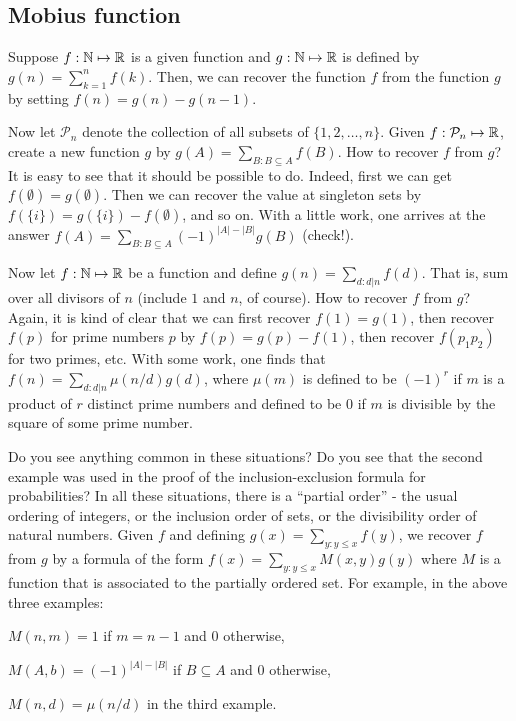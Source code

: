 \documentclass[preprint,  11pt]{amsart}
\begin{document}
{\color{Sepia}
\small
\subsection{Mobius function} Suppose $f:\mathbb{N}\mapsto \mathbb{R}$ is a given function and $g:\mathbb{N}\mapsto \mathbb{R}$ is defined by $g(n)=\sum_{k=1}^n f(k)$. Then, we can recover the function $f$ from the function $g$ by setting $f(n)=g(n)-g(n-1)$. 

Now let $\mathcal P_n$ denote the collection of all subsets of $\{1,2,\ldots ,n\}$. Given $f:\mathcal P_n\mapsto \mathbb{R}$, create a new function $g$ by $g(A)=\sum_{B:B\subseteq A} f(B)$. How to recover $f$ from $g$? It is easy to see that it should be possible to do. Indeed, first we can get $f(\emptyset)=g(\emptyset)$. Then we can recover the value at singleton sets by $f(\{i\})=g(\{i\})-f(\emptyset)$, and so on. With a little work, one arrives at the answer $f(A)=\sum_{B:B\subseteq A}(-1)^{|A|-|B|}g(B)$ (check!). 

Now let $f:\mathbb{N}\mapsto \mathbb{R}$ be a function and define $g(n)=\sum_{d:d| n}f(d)$. That is, sum over all divisors of $n$ (include $1$ and $n$, of course). How to recover $f$ from $g$? Again, it is kind of clear that we can first recover $f(1)=g(1)$, then recover $f(p)$ for prime numbers $p$ by $f(p)=g(p)-f(1)$, then recover $f(p_1p_2)$ for two primes, etc. With some work, one finds that $f(n)=\sum_{d: d| n}\mu(n/d) g(d)$, where $\mu(m)$ is defined to be $(-1)^r$ if $m$ is a product of $r$ distinct prime numbers and defined to be $0$ if $m$ is divisible by the square of some prime number.

Do you see anything common in these situations? Do you see that the second example was used in the proof of the inclusion-exclusion formula for probabilities? In all these situations, there is a ``partial order'' - the usual ordering of integers, or the inclusion order of sets, or the divisibility order of natural numbers. Given $f$ and defining $g(x)=\sum_{y:y\le x}f(y)$, we recover $f$ from $g$ by a formula of the form $f(x)=\sum_{y:y\le x}M(x,y)g(y)$ where $M$ is a function that is associated to the partially ordered set. For example, in the above three examples: \begin{inparaenum}[(a)] \item $M(n,m)=1$ if $m=n-1$ and $0$ otherwise, \item $M(A,b)=(-1)^{|A|-|B|}$ if $B\subseteq A$ and $0$ otherwise, \item $M(n,d)=\mu(n/d)$ in the third example. \end{inparaenum}

\normalsize
}
\end{document}
